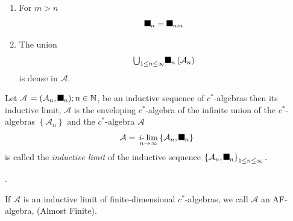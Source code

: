\documentclass[aps,preprint]{revtex4}%
\providecommand{\U}[1]{\protect\rule{.1in}{.1in}}
\begin{document}
\begin{enumerate}
\item For $m>n$%
\begin{equation}
\U{3c3} _{n}=\U{3c0} _{nm}%
\end{equation}


\item The union
\begin{equation}%
{\textstyle\bigcup_{1\leq n\leq\infty}}
\U{3c3} _{n}\left(  \mathcal{A}_{n}\right)
\end{equation}
is dense in $\mathcal{A}.$
\end{enumerate}

Let $\mathcal{A}$ $=(\mathcal{A}_{n},\U{3b1} _{n});n\in\mathbb{N}$, be an
inductive sequence of $c^{\ast}$-algebras then its inductive limit,
$\mathcal{A}$ is the enveloping $c^{\ast}$-algebra of the infinite union of
the $c^{\ast}$-algebras $\left\{  \mathcal{A}_{n}\right\}  $ and the $c^{\ast
}$-algebra $\mathcal{A}$
\begin{equation}
\mathcal{A}=\,\underset{n\rightarrow\infty}{i\text{-}\lim}\left\{
\mathcal{A}_{n},\U{3c0} _{n}\right\}
\end{equation}
is called the \emph{inductive limit} of the inductive sequence $\left\{
\mathcal{A}_{n},\U{3c0} _{n}\right\}  _{1\leq n\leq\infty}.$

. 

If $\mathcal{A}$ is an inductive limit of finite-dimensional $c^{\ast}%
$-algebras, we call $\mathcal{A}$ an AF-algebra, (Almost Finite). 

\bigskip
\end{document}
